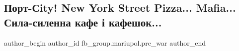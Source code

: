  
 
 
 
 

\subsection{Порт-Сity! New York Street Pizza... Mafia... Сила-силенна кафе і кафешок...}
\label{sec:09_02_2023.fb.fb_group.mariupol.pre_war.3.port_sity__new_york_}

\ifcmt
 author_begin
   author_id fb_group.mariupol.pre_war
 author_end
\fi
